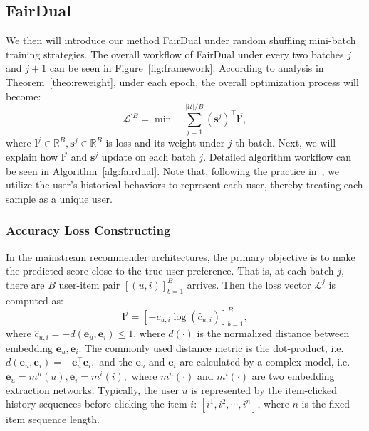 


\subsection{FairDual}

We then will introduce our method FairDual under random shuffling mini-batch training strategies. The overall workflow of FairDual under every two batches $j$ and $j+1$ can be seen in Figure~\ref{fig:framework}. According to analysis in Theorem~\ref{theo:reweight}, under each epoch, the overall optimization process will become:
\begin{equation}\label{eq:dual_loss}
     \mathcal{L}^{'B} = \min \quad \sum_{j=1}^{|\mathcal{U}|/B} (\bm{s}^j)^{\top}\bm{l}^j,
\end{equation}
where $\bm{l}^j\in\mathbb{R}^B, \bm{s}^j\in\mathbb{R}^B$ is loss and its weight under $j$-th batch.
Next, we will explain how $\bm{l}^j$ and $\bm{s}^j$ update on each batch $j$. Detailed algorithm workflow can be seen in Algorithm~\ref{alg:fairdual}. Note that, following the practice in~\cite{bao2023bi}, we utilize the user's historical behaviors to represent each user, thereby treating each sample as a unique user.


\subsubsection{Accuracy Loss Constructing}\label{sec:backbone}
In the mainstream recommender architectures, the primary objective is to make the predicted score close to the true user preference. That is, at each batch $j$, there are $B$ user-item pair $[(u, i)]_{b=1}^B$ arrives. Then the loss vector $\mathcal{L}^j$ is computed as:
\begin{equation}\label{eq:acc_loss}
    \bm{l}^j = [-c_{u, i}\log(\hat{c}_{u,i})]_{b=1}^B,
\end{equation}
where
$\hat{c}_{u,i} = -d(\bm{e}_{u}, \bm{e}_{i})\leq 1$,
where $d(\cdot)$ is the normalized distance between embedding $\bm{e}_{u}, \bm{e}_{i}$. The commonly used distance metric is the dot-product, i.e.
$
    d(\bm{e}_u, \bm{e}_i) = -\bm{e}_u^{\top}\bm{e}_i,
$
and the $\bm{e}_{u}$ and $\bm{e}_{i}$ are calculated by a complex model, i.e. 
$
    \bm{e}_{u} = m^u(u), \bm{e}_{i} = m^i(i),
$
where $m^u(\cdot)$ and $ m^i(\cdot)$ are two embedding extraction networks. Typically, the user $u$ is represented by the item-clicked history sequences before clicking the item $i$: $[i^1, i^2, \cdots, i^n]$, where $n$ is the fixed item sequence length. 

